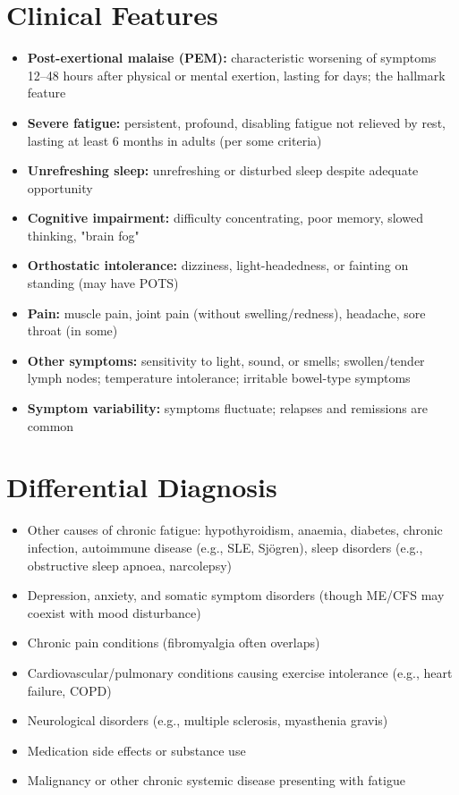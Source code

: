 \section*{Clinical Features}
\begin{itemize}
    \item \textbf{Post-exertional malaise (PEM):} characteristic worsening of symptoms 12--48 hours after physical or mental exertion, lasting for days; the hallmark feature
    \item \textbf{Severe fatigue:} persistent, profound, disabling fatigue not relieved by rest, lasting at least 6 months in adults (per some criteria)
    \item \textbf{Unrefreshing sleep:} unrefreshing or disturbed sleep despite adequate opportunity
    \item \textbf{Cognitive impairment:} difficulty concentrating, poor memory, slowed thinking, "brain fog"
    \item \textbf{Orthostatic intolerance:} dizziness, light-headedness, or fainting on standing (may have POTS)
    \item \textbf{Pain:} muscle pain, joint pain (without swelling/redness), headache, sore throat (in some)
    \item \textbf{Other symptoms:} sensitivity to light, sound, or smells; swollen/tender lymph nodes; temperature intolerance; irritable bowel-type symptoms
    \item \textbf{Symptom variability:} symptoms fluctuate; relapses and remissions are common
\end{itemize}

\section*{Differential Diagnosis}
\begin{itemize}
    \item Other causes of chronic fatigue: hypothyroidism, anaemia, diabetes, chronic infection, autoimmune disease (e.g., SLE, Sjögren), sleep disorders (e.g., obstructive sleep apnoea, narcolepsy)
    \item Depression, anxiety, and somatic symptom disorders (though ME/CFS may coexist with mood disturbance)
    \item Chronic pain conditions (fibromyalgia often overlaps)
    \item Cardiovascular/pulmonary conditions causing exercise intolerance (e.g., heart failure, COPD)
    \item Neurological disorders (e.g., multiple sclerosis, myasthenia gravis)
    \item Medication side effects or substance use
    \item Malignancy or other chronic systemic disease presenting with fatigue
\end{itemize}

